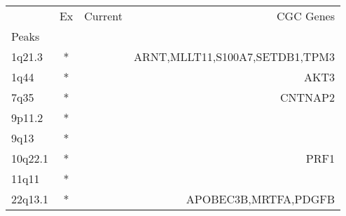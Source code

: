 \begin{tabular}{lccr}
\toprule
{} & Ex & Current &                       CGC Genes \\
Peaks   &    &         &                                 \\
\midrule
1q21.3  &  * &         &  ARNT,MLLT11,S100A7,SETDB1,TPM3 \\
1q44    &  * &         &                            AKT3 \\
7q35    &  * &         &                         CNTNAP2 \\
9p11.2  &  * &         &                                 \\
9q13    &  * &         &                                 \\
10q22.1 &  * &         &                            PRF1 \\
11q11   &  * &         &                                 \\
22q13.1 &  * &         &            APOBEC3B,MRTFA,PDGFB \\
\bottomrule
\end{tabular}
